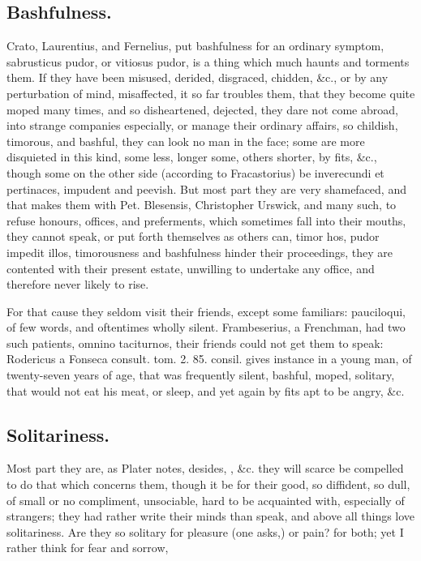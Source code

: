 {\subsection{Bashfulness.}
Crato, Laurentius, and Fernelius, put
bashfulness for an ordinary symptom, sabrusticus pudor, or vitiosus
pudor, is a thing which much haunts and torments them. If they have
been misused, derided, disgraced, chidden, \&c., or by any perturbation
of mind, misaffected, it so far troubles them, that they become quite
moped many times, and so disheartened, dejected, they dare not come
abroad, into strange companies especially, or manage their ordinary
affairs, so childish, timorous, and bashful, they can look no man in
the face; some are more disquieted in this kind, some less, longer
some, others shorter, by fits, \&c., though some on the other side
(according to Fracastorius) be inverecundi et pertinaces,
impudent and peevish. But most part they are very shamefaced, and that
makes them with Pet. Blesensis, Christopher Urswick, and many such, to
refuse honours, offices, and preferments, which sometimes fall into
their mouths, they cannot speak, or put forth themselves as others can,
timor hos, pudor impedit illos, timorousness and bashfulness hinder
their proceedings, they are contented with their present estate,
unwilling to undertake any office, and therefore never likely to rise.

For that cause they seldom visit their friends, except some familiars:
pauciloqui, of few words, and oftentimes wholly silent. 
Frambeserius, a Frenchman, had two such patients, omnino taciturnos,
their friends could not get them to speak: Rodericus a Fonseca consult.
tom. 2. 85. consil. gives instance in a young man, of twenty-seven
years of age, that was frequently silent, bashful, moped, solitary,
that would not eat his meat, or sleep, and yet again by fits apt to be
angry, \&c.

\subsection{Solitariness.}
Most part they are, as Plater notes, desides,
, \&c. they will
scarce be compelled to do that which concerns them, though it be for
their good, so diffident, so dull, of small or no compliment,
unsociable, hard to be acquainted with, especially of strangers; they
had rather write their minds than speak, and above all things love
solitariness.  Are they so
solitary for pleasure (one asks,) or pain? for both; yet I rather think
for fear and sorrow, \etc{}

}
